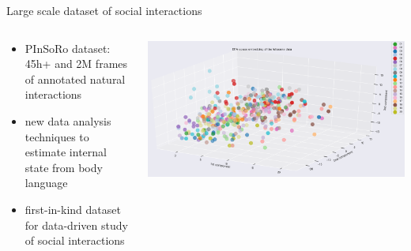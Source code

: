 \documentclass[xcolor=table]{beamer}
\begin{document}
{\begin{frame}{Large scale dataset of social interactions}
\begin{columns}
\begin{column}{0.5\linewidth}
        \end{column}
    \end{columns}
    \vspace{0.5cm}
\begin{columns}
    \begin{column}{0.5\linewidth}
        {\scriptsize
        \begin{itemize}
            \item PInSoRo dataset: 45h+ and 2M frames of annotated natural interactions
            \item new data analysis techniques to estimate internal state from body language
            \item first-in-kind dataset for data-driven study of social
                interactions
        \end{itemize}
        }
    \end{column}
    \begin{column}{0.5\linewidth}
            \includegraphics[trim=1cm 0 4cm 0,clip,width=\columnwidth]{kinematics_social_dynamics/efa-embeddings.png}
    \end{column}
\end{columns}

\end{frame}
}
\end{document}
